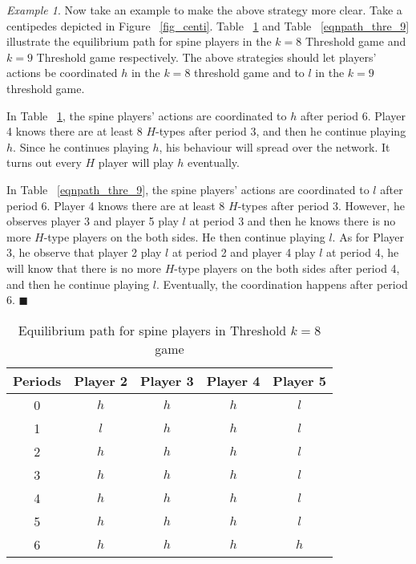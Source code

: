 \documentclass[12pt,letter]{article}
\theoremstyle{remark}
\newtheorem{example}{Example}[section]
\theoremstyle{remark}
\theoremstyle{claim}
\begin{document}
\bigskip
\begin{example}
Now take an example to make the above strategy more clear. Take a centipedes depicted in Figure ~\ref{fig_centi}. Table ~\ref{eqnpath_thre_8} and Table ~\ref{eqnpath_thre_9} illustrate the equilibrium path for spine players in the $k=8$ Threshold game and $k=9$ Threshold game respectively. The above strategies should let players' actions be coordinated $h$ in the $k=8$ threshold game and to $l$ in the $k=9$ threshold game.

In Table ~\ref{eqnpath_thre_8}, the spine players' actions are coordinated to $h$ after period 6. Player 4 knows there are at least $8$ $H$-types after period 3, and then he continue playing $h$. Since he continues playing $h$, his behaviour will spread over the network. It turns out every $H$ player will play $h$ eventually.

In Table ~\ref{eqnpath_thre_9}, the spine players' actions are coordinated to $l$ after period 6. Player 4 knows there are at least $8$ $H$-types after period 3. However, he observes player 3 and player 5 play $l$ at period 3 and then he knows there is no more $H$-type players on the both sides. He then continue playing $l$. As for Player 3, he observe that player 2 play $l$ at period 2 and player 4 play $l$ at period 4, he will know that there is no more $H$-type players on the both sides after period 4, and then he continue playing $l$. Eventually, the coordination happens after period 6. $\blacksquare$

\end{example}

\bigskip

\begin{table}[tbp]
\caption{Equilibrium path for spine players in Threshold $k=8$ game}
\label{eqnpath_thre_8}
\begin{center}
\begin{tabular}{ccccc}
Periods & Player 2 & Player 3 & Player 4 & Player 5 \\ \hline \hline
0 & $h$ & $h$ & $h$ & $l$\\ 
1 & $l$ & $h$ & $h$ & $l$\\ 
2 & $h$ & $h$ & $h$ & $l$\\ 
3 & $h$ & $h$ & $h$ & $l$\\ 
4 & $h$ & $h$ & $h$ & $l$\\ 
5 & $h$ & $h$ & $h$ & $l$\\ 
6 & $h$ & $h$ & $h$ & $h$\\ \hline \hline
\end{tabular}
\end{center}
\end{table}
\end{document}
